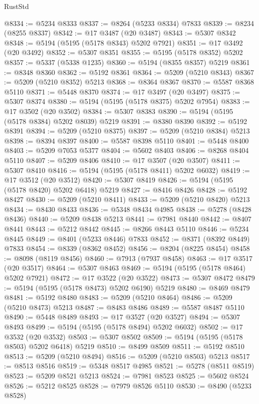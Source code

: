 \begin{lexlean}{RustStd}
\begin{coremodule}
@8334 := @5234 @8333
@8337 := @8264 (@5233 @8334) @7833
@8339 := @8234 (@8255 @8337)
@8342 := @17 @3487 (@20 @3487)
@8343 := @5307 @8342
@8348 := @5194 (@5195 (@5178 @8343) @5202 @7921)
@8351 := @17 @3492 (@20 @3492)
@8352 := @5307 @8351
@8355 := @5195 (@5178 @8352) @5202
@8357 := @5337 (@5338 @1235)
@8360 := @5194 (@8355 @8357) @5219
@8361 := @8348 @8360
@8362 := @5192 @8361
@8364 := @5209 (@5210 @8343)
@8367 := @5209 (@5210 @8352) @5213
@8368 := @8364 @8367
@8370 := @5587 @8368 @5110
@8371 := @5448 @8370
@8374 := @17 @3497 (@20 @3497)
@8375 := @5307 @8374
@8380 := @5194 (@5195 (@5178 @8375) @5202 @7954)
@8383 := @17 @3502 (@20 @3502)
@8384 := @5307 @8383
@8390 := @5194 (@5195 (@5178 @8384) @5202 @8039) @5219
@8391 := @8380 @8390
@8392 := @5192 @8391
@8394 := @5209 (@5210 @8375)
@8397 := @5209 (@5210 @8384) @5213
@8398 := @8394 @8397
@8400 := @5587 @8398 @5110
@8401 := @5448 @8400
@8403 := @5209 @7053 @5377
@8404 := @5602 @8403
@8406 := @8268 @8404 @5110
@8407 := @5209 @8406
@8410 := @17 @3507 (@20 @3507)
@8411 := @5307 @8410
@8416 := @5194 (@5195 (@5178 @8411) @5202 @6032)
@8419 := @17 @3512 (@20 @3512)
@8420 := @5307 @8419
@8426 := @5194 (@5195 (@5178 @8420) @5202 @6418) @5219
@8427 := @8416 @8426
@8428 := @5192 @8427
@8430 := @5209 (@5210 @8411)
@8433 := @5209 (@5210 @8420) @5213
@8434 := @8430 @8433
@8436 := @5348 @8434 @4985
@8438 := @5278 (@8428 @8436)
@8440 := @5209 @8438 @5213
@8441 := @7981 @8440
@8442 := @8407 @8441
@8443 := @5212 @8442
@8445 := @8266 @8443 @5110
@8446 := @5234 @8445
@8449 := @8401 (@5233 @8446) @7833
@8452 := @8371 (@8392 @8449) @7833
@8454 := @8339 (@8362 @8452)
@8456 := @8204 (@8225 @8454)
@8458 := @8098 (@8119 @8456)
@8460 := @7913 (@7937 @8458)
@8463 := @17 @3517 (@20 @3517)
@8464 := @5307 @8463
@8469 := @5194 (@5195 (@5178 @8464) @5202 @7921)
@8472 := @17 @3522 (@20 @3522)
@8473 := @5307 @8472
@8479 := @5194 (@5195 (@5178 @8473) @5202 @6190) @5219
@8480 := @8469 @8479
@8481 := @5192 @8480
@8483 := @5209 (@5210 @8464)
@8486 := @5209 (@5210 @8473) @5213
@8487 := @8483 @8486
@8489 := @5587 @8487 @5110
@8490 := @5448 @8489
@8493 := @17 @3527 (@20 @3527)
@8494 := @5307 @8493
@8499 := @5194 (@5195 (@5178 @8494) @5202 @6032)
@8502 := @17 @3532 (@20 @3532)
@8503 := @5307 @8502
@8509 := @5194 (@5195 (@5178 @8503) @5202 @6418) @5219
@8510 := @8499 @8509
@8511 := @5192 @8510
@8513 := @5209 (@5210 @8494)
@8516 := @5209 (@5210 @8503) @5213
@8517 := @8513 @8516
@8519 := @5348 @8517 @4985
@8521 := @5278 (@8511 @8519)
@8523 := @5209 @8521 @5213
@8524 := @7981 @8523
@8525 := @5602 @8524
@8526 := @5212 @8525
@8528 := @7979 @8526 @5110
@8530 := @8490 (@5233 @8528)

\end{coremodule}
\end{lexlean}
